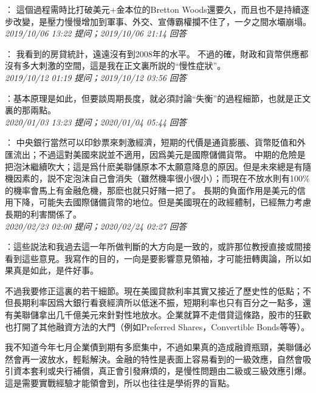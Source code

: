 \documentclass[twocolumn]{ctexart}
\begin{document}
：
這個過程需時比打破美元+金本位的Bretton Woods還要久，而且也不是持續逐步改變，是壓力慢慢增加到軍事、外交、宣傳霸權攔不住了，一夕之間水壩崩塌。
\\

\textit{\hfill\noindent\small 2019/10/06 13:22 提问；2019/10/06 21:14 回答}

：
我看到的房貸統計，遠遠沒有到2008年的水平。
不過的確，財政和貨幣供應都沒有多大刺激的空間，這是我在正文裏所説的“慢性症狀”。
\\

\textit{\hfill\noindent\small 2019/10/12 01:19 提问；2019/10/12 03:56 回答}

：基本原理是如此，但要談周期長度，就必須討論“失衡”的過程細節，也就是正文裏的那兩點。
\\

\textit{\hfill\noindent\small 2020/01/03 13:23 提问；2020/01/04 05:44 回答}

：
中央銀行當然可以印鈔票來刺激經濟，短期的代價是通貨膨脹、貨幣貶值和外匯流出；不過這對美國來説並不適用，因爲美元是國際儲備貨幣。 
中期的危險是把泡沐繼續吹大；這是爲什麽美聯儲原本不太願意降息的原因。但是未來總是有隨機因素的，説不定泡沫自己會消失（雖然機率很小很小）；而現在不放水則有100\%的機率會馬上有金融危機，那麽也就只好賭一把了。 
長期的負面作用是美元的信用下降，可能失去國際儲備貨幣的地位。但是美國現在的政經體制，已經無力考慮長期的利害關係了。
\\

\textit{\hfill\noindent\small 2020/02/23 02:00 提问；2020/02/24 02:27 回答}

：這些説法和我過去這一年所做判斷的大方向是一致的，或許那位教授直接或間接看到這些意見。我寫作的目的，一向是要影響意見領袖，才可能扭轉輿論，所以如果真是如此，是件好事。

不過我要修正這裏的若干細節。現在美國貸款利率其實又接近了歷史性的低點；不但長期利率因爲大銀行看衰經濟所以低迷不振，短期利率也只有百分之一點多，還有美聯儲拿出几千億美元來針對性地放水。企業就算不走借貸這條路，股市的狂歡也打開了其他融資方法的大門（例如Preferred Shares，Convertible Bonds等等）。

我不知道今年七月企業債到期有多麽集中，不過如果真的造成融資瓶頸，美聯儲必然會再一波放水，輕鬆解決。金融的特性是表面上容易看到的一級效應，自然會吸引資本套利或央行補償，真正會引發麻煩的，是慢性問題由二級或三級效應引爆。這是需要實戰經驗才能領會到，所以也往往是學術界的盲點。
\\
\end{document}

